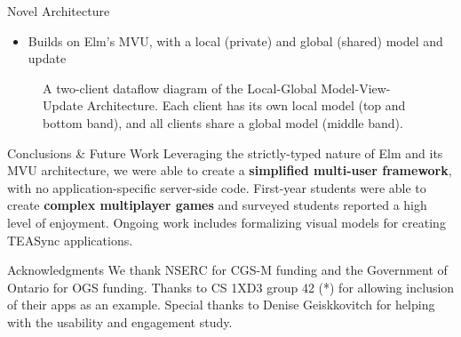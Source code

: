 \documentclass[24pt]{beamer}
\begin{document}
\begin{frame}[fragile]
\begin{textblock}{7.25}
\begin{block}{\fontsize{37}{20}\selectfont Novel Architecture}
\begin{itemize}
    \item Builds on Elm's MVU, with a local (private) and global (shared) model and update
\end{itemize}
\begin{figure}
\caption{A two-client dataflow diagram of the Local-Global Model-View-Update Architecture. Each client has its own local model (top and bottom band), and all clients share a global model (middle band).}
\label{Fig:TEA}
\end{figure}
\vspace{-6mm}
\end{block}

\begin{block}{\fontsize{37}{20}\selectfont Conclusions \& Future Work}
Leveraging the strictly-typed nature of Elm and its MVU architecture, we were able
to create a \textbf{simplified multi-user framework}, with no application-specific 
server-side code. First-year students were able to create \textbf{complex multiplayer
games} and surveyed students reported a high level of enjoyment. Ongoing work includes 
formalizing visual models for creating TEASync 
applications.
\end{block}


\begin{block}{\fontsize{37}{20}\selectfont Acknowledgments}
We thank NSERC for CGS-M funding and the Government of Ontario for OGS funding. 
Thanks to CS 1XD3 group 42 (*) for allowing inclusion of
their apps as an example. Special thanks to Denise Geiskkovitch for helping with the 
usability and engagement study.
\end{block}


\end{textblock}
\end{frame}
\end{document}
